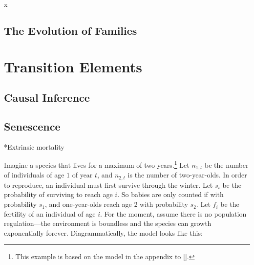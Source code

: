 \documentclass[10pt,reqno]{amsbook}
\makeatletter
\renewcommand\section{\@startsection{section}{1}
\z@{.7\linespacing\@plus\linespacing}{.5\linespacing}
{\large\bfseries\itshape}}
\numberwithin{equation}{chapter}
\makeatother
\begin{document}
x



\def \chapterElement {K}
\chapter{The Evolution of Families}

\lipsum[12-14]


\part{Transition Elements}




\setcounter{chapter}{6}
\def \chapterElement {Ki}
\chapter{Causal Inference}


\lipsum[2-4]




\setcounter{chapter}{10}
\def \chapterElement {Se}
\chapter{Senescence}


\lipsum[2-4]

\section*{Extrinsic mortality}

Imagine a species that lives for a maximum of two years.\footnote{This example is based on the model in the appendix to [].} Let $n_{1,t}$ be the number of individuals of age $1$ of year $t$, and $n_{2,t}$ is the number of two-year-olds. In order to reproduce, an individual must first survive through the winter. Let $s_i$ be the probability of surviving to reach age $i$. So babies are only counted if with probability $s_1$, and one-year-olds reach age 2 with probability $s_2$. Let $f_i$ be the fertility of an individual of age $i$. For the moment, assume there is no population regulation---the environment is boundless and the species can growth exponentially forever. Diagrammatically, the model looks like this:
\end{document}
